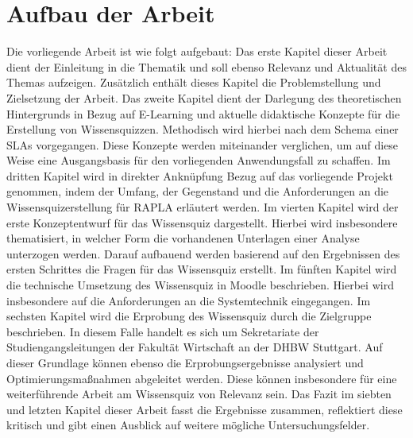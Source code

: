 \section{Aufbau der Arbeit}
Die vorliegende Arbeit ist wie folgt aufgebaut: Das erste Kapitel
dieser Arbeit dient der Einleitung in die Thematik und soll ebenso
Relevanz und Aktualität des Themas aufzeigen. Zusätzlich enthält dieses
Kapitel die Problemstellung und Zielsetzung der Arbeit. Das zweite Kapitel
dient der Darlegung des theoretischen Hintergrunds in Bezug auf
E-Learning und aktuelle didaktische Konzepte
für die Erstellung von Wissensquizzen. Methodisch wird hierbei
nach dem Schema einer \acp{SLA} vorgegangen. Diese Konzepte werden
miteinander verglichen, um auf diese Weise eine Ausgangsbasis
für den vorliegenden Anwendungsfall zu schaffen.
Im dritten Kapitel wird in direkter Anknüpfung Bezug auf das vorliegende Projekt
genommen, indem der Umfang, der Gegenstand und die Anforderungen an die Wissensquizerstellung
für \ac{RAPLA} erläutert werden.
Im vierten Kapitel wird der erste Konzeptentwurf für das Wissensquiz
dargestellt. Hierbei wird insbesondere thematisiert, in welcher Form
die vorhandenen Unterlagen einer Analyse unterzogen werden. Darauf aufbauend
werden basierend auf den Ergebnissen des ersten Schrittes die Fragen für das Wissensquiz
erstellt. Im fünften Kapitel wird die technische Umsetzung des Wissensquiz
in Moodle beschrieben. Hierbei wird insbesondere auf die Anforderungen an die
Systemtechnik eingegangen. Im sechsten Kapitel wird die Erprobung des Wissensquiz
durch die Zielgruppe beschrieben. In diesem Falle handelt es sich um Sekretariate
der Studiengangsleitungen der Fakultät Wirtschaft an der \ac{DHBW} Stuttgart.
Auf dieser Grundlage können ebenso die Erprobungsergebnisse analysiert und
Optimierungsmaßnahmen abgeleitet werden.
Diese können insbesondere für eine weiterführende Arbeit
am Wissensquiz von Relevanz sein. Das Fazit im siebten und letzten Kapitel
dieser Arbeit fasst die Ergebnisse zusammen, reflektiert diese kritisch und gibt einen Ausblick auf
weitere mögliche Untersuchungsfelder.